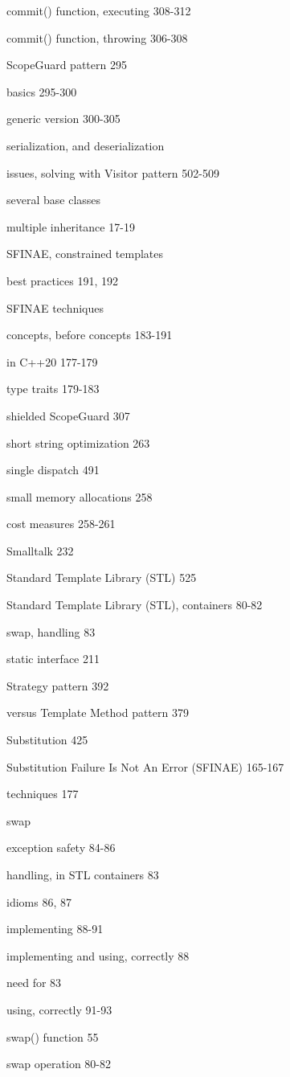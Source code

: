 commit() function, executing 308-312

commit() function, throwing 306-308

ScopeGuard pattern 295

basics 295-300

generic version 300-305

serialization, and deserialization

issues, solving with Visitor pattern 502-509

several base classes

multiple inheritance 17-19

SFINAE, constrained templates

best practices 191, 192

SFINAE techniques

concepts, before concepts 183-191

in C++20 177-179

type traits 179-183

shielded ScopeGuard 307

short string optimization 263

single dispatch 491

small memory allocations 258

cost measures 258-261

Smalltalk 232

Standard Template Library (STL) 525

Standard Template Library (STL), containers 80-82

swap, handling 83

static interface 211

Strategy pattern 392

versus Template Method pattern 379

Substitution 425

Substitution Failure Is Not An Error (SFINAE) 165-167

techniques 177

swap

exception safety 84-86

handling, in STL containers 83

idioms 86, 87

implementing 88-91

implementing and using, correctly 88

need for 83

using, correctly 91-93

swap() function 55

swap operation 80-82

